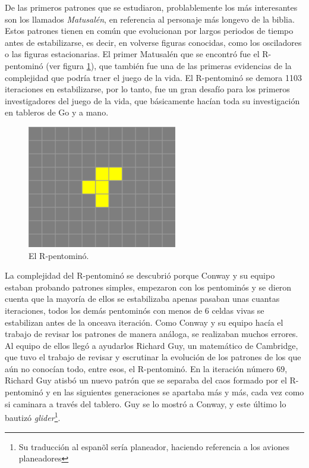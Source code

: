 De las primeros patrones que se estudiaron, problablemente los m\'as interesantes son los llamados \textit{Matusal\'en}, en referencia al personaje m\'as longevo de la biblia. Estos patrones tienen en com\'un que evolucionan por largos periodos de tiempo antes de estabilizarse, es decir, en volverse figuras conocidas, como los osciladores o las figuras estacionarias. El primer Matusal\'en que se encontr\'o fue el R-pentomin\'o (ver figura \ref{figure:pentomino-r}), que tambi\'en fue una de las primeras evidencias de la complejidad que podr\'ia traer el juego de la vida. El R-pentomin\'o se demora 1103 iteraciones en estabilizarse, por lo tanto, fue un gran desaf\'io para los primeros investigadores del juego de la vida, que b\'asicamente hac\'ian toda su investigaci\'on en tableros de Go y a mano.

\begin{figure}[h]
    \centering
    \includegraphics[width=.4\textwidth]{images/life-r-pentomino.png}
    \caption{El R-pentomin\'o.}
    \label{figure:pentomino-r}
\end{figure}

La complejidad del R-pentomin\'o se descubri\'o porque Conway y su equipo estaban probando patrones simples, empezaron con los pentomin\'os y se dieron cuenta que la mayor\'ia de ellos se estabilizaba apenas pasaban unas cuantas iteraciones, todos los dem\'as pentomin\'os con menos de 6 celdas vivas se estabilizan antes de la onceava iteraci\'on. Como Conway y su equipo hac\'ia el trabajo de revisar los patrones de manera an\'aloga, se realizaban muchos errores. Al equipo de ellos lleg\'o a ayudarlos Richard Guy, un matem\'atico de Cambridge, que tuvo el trabajo de revisar y escrutinar la evoluci\'on de los patrones de los que a\'un no conoc\'ian todo, entre esos, el R-pentomin\'o. En la iteraci\'on n\'umero $69$, Richard Guy atisb\'o un nuevo patr\'on que se separaba del caos formado por el R-pentomin\'o y en las siguientes generaciones se apartaba m\'as y m\'as, cada vez como si caminara a trav\'es del tablero. Guy se lo mostr\'o a Conway, y este \'ultimo lo bautiz\'o \textit{glider}\footnote{Su traducci\'on al espan\~ol ser\'ia planeador, haciendo referencia a los aviones planeadores}.

